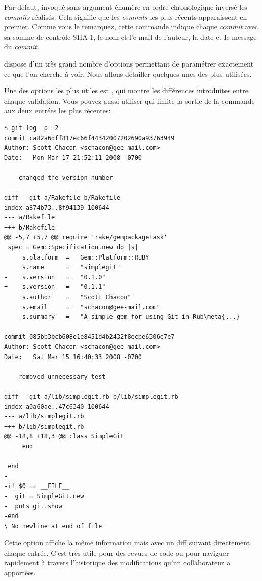 Par défaut,  invoqué sans argument énumère en ordre chronologique inversé les \emph{commits} réalisés.
Cela signifie que les \emph{commits} les plus récents apparaissent en premier.
Comme vous le remarquez, cette commande indique chaque \emph{commit} avec sa somme de contrôle SHA-1, le nom et l'e-mail de l'auteur, la date et le message du \emph{commit}.

 dispose d'un très grand nombre d'options permettant de paramétrer exactement ce que l'on cherche à voir.
Nous allons détailler quelques-unes des plus utilisées.

Une des options les plus utiles est , qui montre les différences introduites entre chaque validation.
Vous pouvez aussi utiliser  qui limite la sortie de la commande aux deux entrées les plus récentes:
\begin{Schunk}
\begin{Verbatim}[commandchars=\\\{\}]
$ git log -p -2
commit ca82a6dff817ec66f44342007202690a93763949
Author: Scott Chacon <schacon@gee-mail.com>
Date:   Mon Mar 17 21:52:11 2008 -0700

    changed the version number

diff --git a/Rakefile b/Rakefile
index a874b73..8f94139 100644
--- a/Rakefile
+++ b/Rakefile
@@ -5,7 +5,7 @@ require 'rake/gempackagetask'
 spec = Gem::Specification.new do |s|
     s.platform  =   Gem::Platform::RUBY
     s.name      =   "simplegit"
-    s.version   =   "0.1.0"
+    s.version   =   "0.1.1"
     s.author    =   "Scott Chacon"
     s.email     =   "schacon@gee-mail.com"
     s.summary   =   "A simple gem for using Git in Rub\meta{...}

commit 085bb3bcb608e1e8451d4b2432f8ecbe6306e7e7
Author: Scott Chacon <schacon@gee-mail.com>
Date:   Sat Mar 15 16:40:33 2008 -0700

    removed unnecessary test

diff --git a/lib/simplegit.rb b/lib/simplegit.rb
index a0a60ae..47c6340 100644
--- a/lib/simplegit.rb
+++ b/lib/simplegit.rb
@@ -18,8 +18,3 @@ class SimpleGit
     end

 end
-
-if $0 == __FILE__
-  git = SimpleGit.new
-  puts git.show
-end
\ No newline at end of file
\end{Verbatim}
\end{Schunk}

Cette option affiche la même information mais avec un diff suivant directement chaque entrée.
C'est très utile pour des revues de code ou pour naviguer rapidement à travers l'historique des modifications qu'un collaborateur a apportées.

